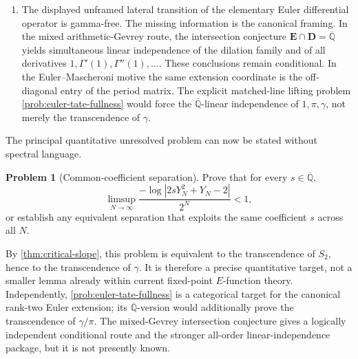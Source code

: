 \documentclass[11pt]{article}
\theoremstyle{keio}
\theoremstyle{definition}
\newtheorem{problem}[theorem]{Problem}
\theoremstyle{remark}
\newcommand{\Qbar}{\overline{\mathbb Q}}
\begin{document}
\begin{enumerate}[label=\textup{(\arabic*)}]
 exact logarithmic linear forms, positivity, and the endpoint factor
 \(p^{(1-\theta)n}\).  Even after the whole factor is favorably credited as
 fixed-place gain, the universal saddle-cancellation inequality shows that
 this ledger does not improve the Pr\'evost baseline.  Balanced factorial
 ratios themselves have only \(O(\log n)\) fixed-prime valuation.
 \item The displayed unframed lateral transition of the elementary Euler
 differential operator is gamma-free.  The missing information is the
 canonical framing.  In the mixed arithmetic-Gevrey route, the intersection
 conjecture \(\mathbf E\cap\mathbf D=\Qbar\) yields simultaneous linear
 independence of the dilation family and of all derivatives
 \(1,\Gamma'(1),\Gamma''(1),\ldots\).  These conclusions remain
 conditional.  In the Euler--Mascheroni motive the same extension
 coordinate is the off-diagonal entry of the period matrix.  The explicit
 matched-line lifting problem \cref{prob:euler-tate-fullness} would force
 the \(\Qbar\)-linear independence of \(1,\pi,\gamma\), not merely the
 transcendence of \(\gamma\).
\end{enumerate}

The principal quantitative unresolved problem can now be stated without
spectral language.

\begin{problem}[Common-coefficient separation]
\label{prob:common-coefficient}
Prove that for every \(s\in\Qbar\),
\[
 \limsup_{N\to\infty}
 \frac{-\log|2sY_N^2+Y_N-2|}{2^N}<1,
\]
or establish any equivalent separation that exploits the same coefficient
\(s\) across all \(N\).
\end{problem}

By \cref{thm:critical-slope}, this problem is equivalent to the
transcendence of \(S_2\), hence to the transcendence of \(\gamma\).  It is
therefore a precise quantitative target, not a smaller lemma already within
current fixed-point \(E\)-function theory.  Independently,
\cref{prob:euler-tate-fullness} is a categorical target for the canonical
rank-two Euler extension; its \(\Qbar\)-version would additionally prove
the transcendence of \(\gamma/\pi\).  The mixed-Gevrey intersection
conjecture gives a logically independent conditional route and the stronger
all-order linear-independence package, but it is not presently known.
\end{document}
